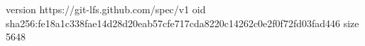 version https://git-lfs.github.com/spec/v1
oid sha256:fe18a1c338fae14d28d20eab57cfe717cda8220c14262c0e2f0f72fd03fad446
size 5648

